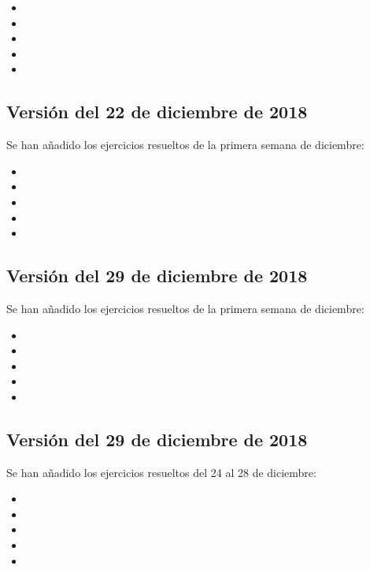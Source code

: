 \documentclass[a4paper,12pt,twoside]{book}
\begin{document}
\begin{itemize}
\item {}
\item {}
\item {}
\item {}
\item {}
\end{itemize}
     
\subsection*{Versión del 22 de diciembre de 2018}

Se han añadido los ejercicios resueltos de la primera semana de
diciembre:

\begin{itemize}
\item {}
\item {}
\item {}
\item {}
\item {}
\end{itemize}
     
\subsection*{Versión del 29 de diciembre de 2018}

Se han añadido los ejercicios resueltos de la primera semana de
diciembre:

\begin{itemize}
\item {}
\item {}
\item {}
\item {}
\item {}
\end{itemize}
     
\subsection*{Versión del 29 de diciembre de 2018}

Se han añadido los ejercicios resueltos del 24 al 28 de
diciembre:

\begin{itemize}
\item {}
\item {}
\item {}
\item {}
\item {}
\end{itemize}
\end{document}

